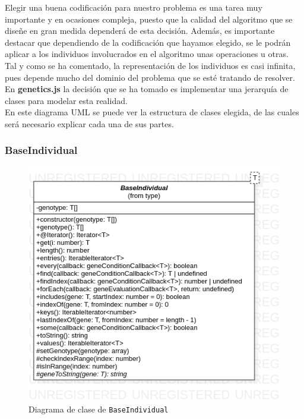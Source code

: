 Elegir una buena codificación para nuestro problema es una tarea muy importante y en ocasiones compleja, puesto que la calidad del algoritmo que se diseñe en gran medida dependerá de esta decisión. Además, es importante destacar que dependiendo de la codificación que hayamos elegido, se le podrán aplicar a los individuos involucrados en el algoritmo unas operaciones u otras. \\

Tal y como se ha comentado, la representación de los individuos es casi infinita, pues depende mucho del dominio del problema que se esté tratando de resolver. En \textbf{genetics.js} la decisión que se ha tomado es implementar una jerarquía de clases para modelar esta realidad. \\

En este diagrama UML se puede ver la estructura de clases elegida, de las cuales será necesario explicar cada una de sus partes.

\subsubsection{BaseIndividual}

\begin{figure}[ht]
    \centering
    \includegraphics[scale=0.6]{mem/images/cap-4/4.2.2(Individuos)/BaseIndividual.png}
    \caption{Diagrama de clase de \texttt{BaseIndividual}}
    \label{fig:baseindividual-uml}
\end{figure}

